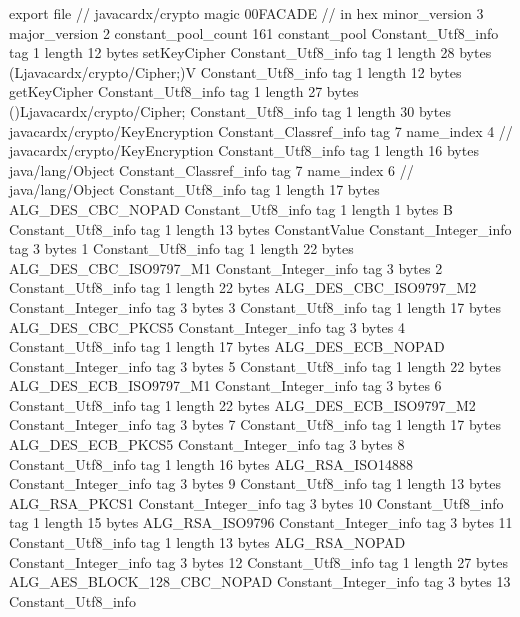 export file {		// javacardx/crypto
	magic	00FACADE		 // in hex
	minor_version	3
	major_version	2
	constant_pool_count	161
	constant_pool {
		Constant_Utf8_info {
			tag	1
			length	12
			bytes	setKeyCipher
		}
		Constant_Utf8_info {
			tag	1
			length	28
			bytes	(Ljavacardx/crypto/Cipher;)V
		}
		Constant_Utf8_info {
			tag	1
			length	12
			bytes	getKeyCipher
		}
		Constant_Utf8_info {
			tag	1
			length	27
			bytes	()Ljavacardx/crypto/Cipher;
		}
		Constant_Utf8_info {
			tag	1
			length	30
			bytes	javacardx/crypto/KeyEncryption
		}
		Constant_Classref_info {
			tag	7
			name_index	4		// javacardx/crypto/KeyEncryption
		}
		Constant_Utf8_info {
			tag	1
			length	16
			bytes	java/lang/Object
		}
		Constant_Classref_info {
			tag	7
			name_index	6		// java/lang/Object
		}
		Constant_Utf8_info {
			tag	1
			length	17
			bytes	ALG_DES_CBC_NOPAD
		}
		Constant_Utf8_info {
			tag	1
			length	1
			bytes	B
		}
		Constant_Utf8_info {
			tag	1
			length	13
			bytes	ConstantValue
		}
		Constant_Integer_info {
			tag	3
			bytes	1
		}
		Constant_Utf8_info {
			tag	1
			length	22
			bytes	ALG_DES_CBC_ISO9797_M1
		}
		Constant_Integer_info {
			tag	3
			bytes	2
		}
		Constant_Utf8_info {
			tag	1
			length	22
			bytes	ALG_DES_CBC_ISO9797_M2
		}
		Constant_Integer_info {
			tag	3
			bytes	3
		}
		Constant_Utf8_info {
			tag	1
			length	17
			bytes	ALG_DES_CBC_PKCS5
		}
		Constant_Integer_info {
			tag	3
			bytes	4
		}
		Constant_Utf8_info {
			tag	1
			length	17
			bytes	ALG_DES_ECB_NOPAD
		}
		Constant_Integer_info {
			tag	3
			bytes	5
		}
		Constant_Utf8_info {
			tag	1
			length	22
			bytes	ALG_DES_ECB_ISO9797_M1
		}
		Constant_Integer_info {
			tag	3
			bytes	6
		}
		Constant_Utf8_info {
			tag	1
			length	22
			bytes	ALG_DES_ECB_ISO9797_M2
		}
		Constant_Integer_info {
			tag	3
			bytes	7
		}
		Constant_Utf8_info {
			tag	1
			length	17
			bytes	ALG_DES_ECB_PKCS5
		}
		Constant_Integer_info {
			tag	3
			bytes	8
		}
		Constant_Utf8_info {
			tag	1
			length	16
			bytes	ALG_RSA_ISO14888
		}
		Constant_Integer_info {
			tag	3
			bytes	9
		}
		Constant_Utf8_info {
			tag	1
			length	13
			bytes	ALG_RSA_PKCS1
		}
		Constant_Integer_info {
			tag	3
			bytes	10
		}
		Constant_Utf8_info {
			tag	1
			length	15
			bytes	ALG_RSA_ISO9796
		}
		Constant_Integer_info {
			tag	3
			bytes	11
		}
		Constant_Utf8_info {
			tag	1
			length	13
			bytes	ALG_RSA_NOPAD
		}
		Constant_Integer_info {
			tag	3
			bytes	12
		}
		Constant_Utf8_info {
			tag	1
			length	27
			bytes	ALG_AES_BLOCK_128_CBC_NOPAD
		}
		Constant_Integer_info {
			tag	3
			bytes	13
		}
		Constant_Utf8_info {
}}}
